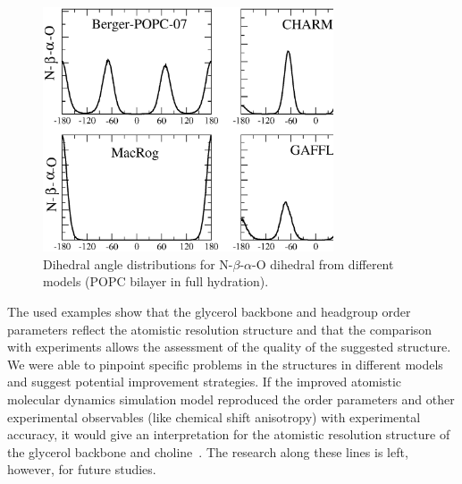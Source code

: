 \documentclass[journal=jacsat,manuscript=article]{achemso}
\begin{document}
\begin{figure}[]
  \centering
  \includegraphics[width=8.6cm]{a-bDIHS2.eps}
  \caption{\label{dihDISTS2}
    Dihedral angle distributions for N-$\beta$-$\alpha$-O dihedral from different models (POPC bilayer in full hydration).
  } 
\end{figure}

The used examples show that the glycerol backbone and headgroup order parameters reflect the atomistic resolution structure
and that the comparison with experiments allows the assessment of the quality of the suggested structure. We were able to pinpoint
specific problems in the structures in different models and suggest potential improvement strategies.
If the improved atomistic
molecular dynamics simulation model reproduced the order parameters and other experimental observables (like chemical shift anisotropy)
with experimental accuracy, it would give an interpretation for the atomistic resolution structure of the glycerol backbone and 
choline~\cite{seelig77b,skarjune79,jacobs80,davis83,akutsu91,hong95b,semchyschyn04}. The research along these lines is left, however,
for future studies.
\end{document}
